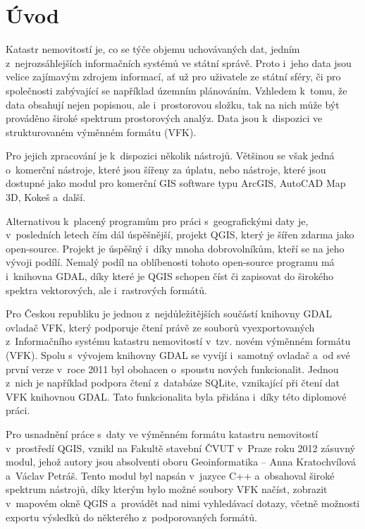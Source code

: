 \documentclass[a4paper,12pt,oneside]{book}
\begin{document}
\chapter*{Úvod}

Katastr nemovitostí je, co se týče objemu uchovávaných dat, jedním
z~nejrozsáhlejších informačních systémů ve státní správě. Proto i~jeho
data jsou velice zajímavým zdrojem informací, ať už pro uživatele ze
státní sféry, či pro společnosti zabývající se například územním
plánováním. Vzhledem k~tomu, že data obsahují nejen popisnou, ale
i~prostorovou složku, tak na nich může být prováděno široké spektrum
prostorových analýz. Data jsou k~dispozici ve strukturovaném výměnném
formátu (VFK).

Pro jejich zpracování je k~dispozici několik nástrojů. Většinou se
však jedná o~komerční nástroje, které jsou šířeny za úplatu, nebo
nástroje, které jsou dostupné jako modul pro komerční GIS software
typu ArcGIS, AutoCAD Map 3D, Kokeš a~další.

Alternativou k~placený programům pro práci s~geografickými daty je,
v~posledních letech čím dál úspěšnější, projekt QGIS, který je šířen zdarma
jako open-source. Projekt je úspěšný i~díky mnoha dobrovolníkům,
kteří se na jeho vývoji podílí. Nemalý podíl na oblíbenosti tohoto
open-source programu má i~knihovna GDAL, díky které je QGIS schopen
číst či zapisovat do širokého spektra vektorových, ale i~rastrových
formátů.

Pro Českou republiku je jednou z~nejdůležitějších součástí knihovny
GDAL ovladač VFK, který podporuje čtení právě ze souborů
vyexportovaných z~Informačního systému katastru nemovitostí
v~tzv. novém výměnném formátu (VFK). Spolu s~vývojem knihovny GDAL se
vyvíjí i~samotný ovladač a~od své první verze v~roce 2011 byl obohacen
o~spoustu nových funkcionalit. Jednou z~nich je například podpora
čtení z~databáze SQLite, vznikající při čtení dat VFK knihovnou
GDAL. Tato funkcionalita byla přidána i~díky této diplomové práci.

Pro usnadnění práce s~daty ve výměnném formátu katastru nemovitostí
v~prostředí QGIS, vznikl na Fakultě stavební ČVUT v~Praze roku 2012
zásuvný modul, jehož autory jsou absolventi oboru
Geoinformatika -- Anna Kratochvílová a~Václav Petráš. Tento modul byl
napsán v~jazyce C++ a~obsahoval široké spektrum nástrojů, díky kterým
bylo možné soubory VFK načíst, zobrazit v~mapovém okně QGIS a~provádět
nad nimi vyhledávací dotazy, včetně možnosti exportu výsledků do
některého z~podporovaných formátů.
\end{document}

